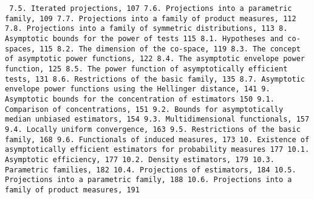  \begin{verbatim} 7.5. Iterated projections, 107 7.6. Projections into a parametric family, 109 7.7. Projections into a family of product measures, 112 7.8. Projections into a family of symmetric distributions, 113 8. Asymptotic bounds for the power of tests 115 8.1. Hypotheses and co-spaces, 115 8.2. The dimension of the co-space, 119 8.3. The concept of asymptotic power functions, 122 8.4. The asymptotic envelope power function, 125 8.5. The power function of asymptotically efficient tests, 131 8.6. Restrictions of the basic family, 135 8.7. Asymptotic envelope power functions using the Hellinger distance, 141 9. Asymptotic bounds for the concentration of estimators 150 9.1. Comparison of concentrations, 151 9.2. Bounds for asymptotically median unbiased estimators, 154 9.3. Multidimensional functionals, 157 9.4. Locally uniform convergence, 163 9.5. Restrictions of the basic family, 168 9.6. Functionals of induced measures, 173 10. Existence of asymptotically efficient estimators for probability measures 177 10.1. Asymptotic efficiency, 177 10.2. Density estimators, 179 10.3. Parametric families, 182 10.4. Projections of estimators, 184 10.5. Projections into a parametric family, 188 10.6. Projections into a family of product measures, 191 \end{verbatim} 